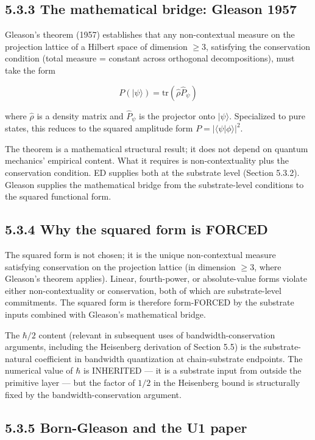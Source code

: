 \documentclass[11pt]{book}
\begin{document}
\subsection{5.3.3 The mathematical bridge: Gleason 1957}

Gleason's theorem (1957) establishes that any non-contextual measure on the projection lattice of a Hilbert space of dimension $\geq 3$, satisfying the conservation condition (total measure = constant across orthogonal decompositions), must take the form

\[
P(|\psi\rangle) = \mathrm{tr}(\hat\rho \hat P_\psi)
\]

where $\hat\rho$ is a density matrix and $\hat P_\psi$ is the projector onto $|\psi\rangle$. Specialized to pure states, this reduces to the squared amplitude form $P = |\langle\psi|\phi\rangle|^2$.

The theorem is a mathematical structural result; it does not depend on quantum mechanics' empirical content. What it requires is non-contextuality plus the conservation condition. ED supplies both at the substrate level (Section 5.3.2). Gleason supplies the mathematical bridge from the substrate-level conditions to the squared functional form.

\subsection{5.3.4 Why the squared form is FORCED}

The squared form is not chosen; it is the unique non-contextual measure satisfying conservation on the projection lattice (in dimension $\geq 3$, where Gleason's theorem applies). Linear, fourth-power, or absolute-value forms violate either non-contextuality or conservation, both of which are substrate-level commitments. The squared form is therefore form-FORCED by the substrate inputs combined with Gleason's mathematical bridge.

The $\hbar/2$ content (relevant in subsequent uses of bandwidth-conservation arguments, including the Heisenberg derivation of Section 5.5) is the substrate-natural coefficient in bandwidth quantization at chain-substrate endpoints. The numerical value of $\hbar$ is INHERITED — it is a substrate input from outside the primitive layer — but the factor of $1/2$ in the Heisenberg bound is structurally fixed by the bandwidth-conservation argument.

\subsection{5.3.5 Born-Gleason and the U1 paper}
\end{document}
